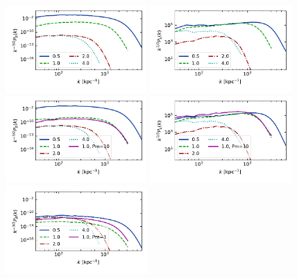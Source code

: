 \documentclass[preprint2]{aastex63}
\begin{document}
\begin{figure}
  \includegraphics[trim=0 1.2cm 0 0.2cm,clip=True,width=0.48\textwidth]{figs/nu0_Bpower.pdf}
  \includegraphics[trim=0 1.2cm 0 0.2cm,clip=True,width=0.48\textwidth]{figs/nu0_kpower.pdf}\\
  \includegraphics[trim=0 1.2cm 0 0.2cm,clip=True,width=0.48\textwidth]{figs/nu1_Bpower.pdf}
  \includegraphics[trim=0 1.2cm 0 0.2cm,clip=True,width=0.48\textwidth]{figs/nu1_kpower.pdf}\\
  \includegraphics[trim=0 1.2cm 0 0.2cm,clip=True,width=0.48\textwidth]{figs/nu10_Bpower.pdf}

\end{figure}
\end{document}

